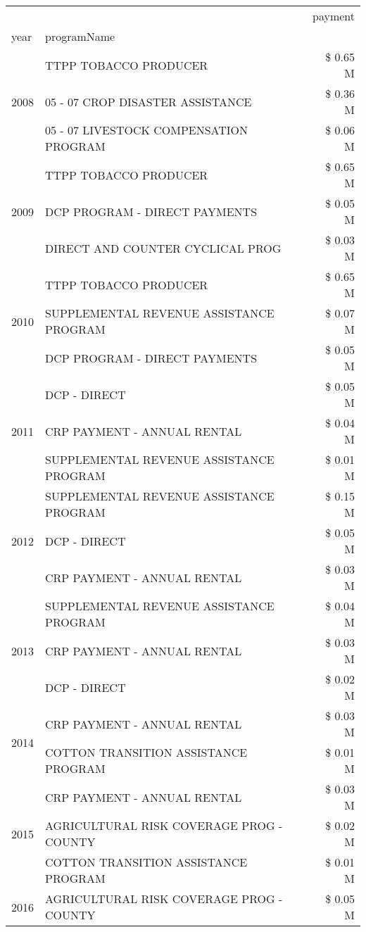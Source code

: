 \begin{tabular}{llr}
\toprule
 &  & payment \\
year & programName &  \\
\midrule
\multirow[t]{3}{*}{2008} & TTPP TOBACCO PRODUCER & \$ 0.65 M \\
 & 05 - 07 CROP DISASTER ASSISTANCE & \$ 0.36 M \\
 & 05 - 07 LIVESTOCK COMPENSATION PROGRAM & \$ 0.06 M \\
\cline{1-3}
\multirow[t]{3}{*}{2009} & TTPP TOBACCO PRODUCER & \$ 0.65 M \\
 & DCP PROGRAM - DIRECT PAYMENTS & \$ 0.05 M \\
 & DIRECT AND COUNTER CYCLICAL PROG & \$ 0.03 M \\
\cline{1-3}
\multirow[t]{3}{*}{2010} & TTPP TOBACCO PRODUCER & \$ 0.65 M \\
 & SUPPLEMENTAL REVENUE ASSISTANCE PROGRAM & \$ 0.07 M \\
 & DCP PROGRAM - DIRECT PAYMENTS & \$ 0.05 M \\
\cline{1-3}
\multirow[t]{3}{*}{2011} & DCP - DIRECT & \$ 0.05 M \\
 & CRP PAYMENT - ANNUAL RENTAL & \$ 0.04 M \\
 & SUPPLEMENTAL REVENUE ASSISTANCE PROGRAM & \$ 0.01 M \\
\cline{1-3}
\multirow[t]{3}{*}{2012} & SUPPLEMENTAL REVENUE ASSISTANCE PROGRAM & \$ 0.15 M \\
 & DCP - DIRECT & \$ 0.05 M \\
 & CRP PAYMENT - ANNUAL RENTAL & \$ 0.03 M \\
\cline{1-3}
\multirow[t]{3}{*}{2013} & SUPPLEMENTAL REVENUE ASSISTANCE PROGRAM & \$ 0.04 M \\
 & CRP PAYMENT - ANNUAL RENTAL & \$ 0.03 M \\
 & DCP - DIRECT & \$ 0.02 M \\
\cline{1-3}
\multirow[t]{2}{*}{2014} & CRP PAYMENT - ANNUAL RENTAL & \$ 0.03 M \\
 & COTTON TRANSITION ASSISTANCE PROGRAM & \$ 0.01 M \\
\cline{1-3}
\multirow[t]{3}{*}{2015} & CRP PAYMENT - ANNUAL RENTAL & \$ 0.03 M \\
 & AGRICULTURAL RISK COVERAGE PROG - COUNTY & \$ 0.02 M \\
 & COTTON TRANSITION ASSISTANCE PROGRAM & \$ 0.01 M \\
\cline{1-3}
\multirow[t]{3}{*}{2016} & AGRICULTURAL RISK COVERAGE PROG - COUNTY & \$ 0.05 M \\

\end{tabular}
